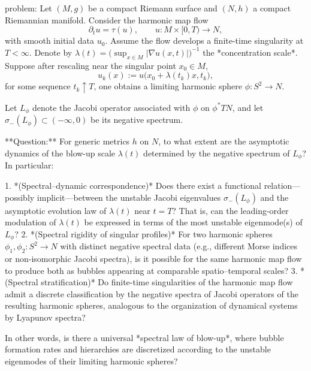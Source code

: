problem:  
Let \( (M,g) \) be a compact Riemann surface and \( (N,h) \) a compact Riemannian manifold. Consider the harmonic map flow  
\[
\partial_t u = \tau(u), \qquad u: M\times [0,T)\to N,
\]
with smooth initial data \(u_0\).  
Assume the flow develops a finite-time singularity at \(T<\infty\).  Denote by \(\lambda(t) = \bigl(\!\sup_{x\in M} |\nabla u(x,t)|\bigr)^{-1}\)  the *concentration scale*.  
Suppose after rescaling near the singular point \(x_0\in M\),
\[
u_k(x) := u\big(x_0 + \lambda(t_k)x, t_k\big),
\]
for some sequence \(t_k\uparrow T\), one obtains a limiting harmonic sphere \(\phi: S^2\to N\).

Let \(L_\phi\) denote the Jacobi operator associated with \(\phi\) on \(\phi^*TN\), and let \(\sigma_-(L_\phi)\subset(-\infty,0)\) be its negative spectrum.  

**Question:**  
For generic metrics \(h\) on \(N\), to what extent are the asymptotic dynamics of the blow-up scale \(\lambda(t)\) determined by the negative spectrum of \(L_\phi\)?  In particular:

1. *(Spectral–dynamic correspondence)* Does there exist a functional relation—possibly implicit—between the unstable Jacobi eigenvalues \(\sigma_-(L_\phi)\) and the asymptotic evolution law of \(\lambda(t)\) near \(t = T\)?  That is, can the leading-order modulation of \(\lambda(t)\) be expressed in terms of the most unstable eigenmode(s) of \(L_\phi\)?  
2. *(Spectral rigidity of singular profiles)* For two harmonic spheres \(\phi_1,\phi_2:S^2\to N\) with distinct negative spectral data (e.g., different Morse indices or non‐isomorphic Jacobi spectra), is it possible for the same harmonic map flow to produce both as bubbles appearing at comparable spatio–temporal scales?  
3. *(Spectral stratification)* Do finite-time singularities of the harmonic map flow admit a discrete classification by the negative spectra of Jacobi operators of the resulting harmonic spheres, analogous to the organization of dynamical systems by Lyapunov spectra?

In other words, is there a universal *spectral law of blow-up*, where bubble formation rates and hierarchies are discretized according to the unstable eigenmodes of their limiting harmonic spheres?

